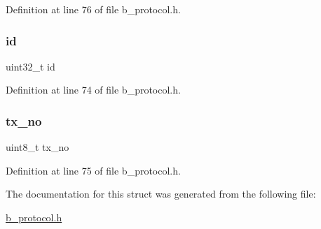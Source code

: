 Definition at line 76 of file b\+\_\+protocol.\+h.

\mbox{\label{structb_protocol_info__t_abaabdc509cdaba7df9f56c6c76f3ae19}} 
\subsubsection{\texorpdfstring{id}{id}}
{\footnotesize\ttfamily uint32\+\_\+t id}



Definition at line 74 of file b\+\_\+protocol.\+h.

\mbox{\label{structb_protocol_info__t_a65a520465829a72b4b90e063340fccbb}} 
\subsubsection{\texorpdfstring{tx\+\_\+no}{tx\_no}}
{\footnotesize\ttfamily uint8\+\_\+t tx\+\_\+no}



Definition at line 75 of file b\+\_\+protocol.\+h.



The documentation for this struct was generated from the following file\+:\begin{DoxyCompactItemize}
\item 
\mbox{\hyperlink{b__protocol_8h}{b\+\_\+protocol.\+h}}\end{DoxyCompactItemize}
